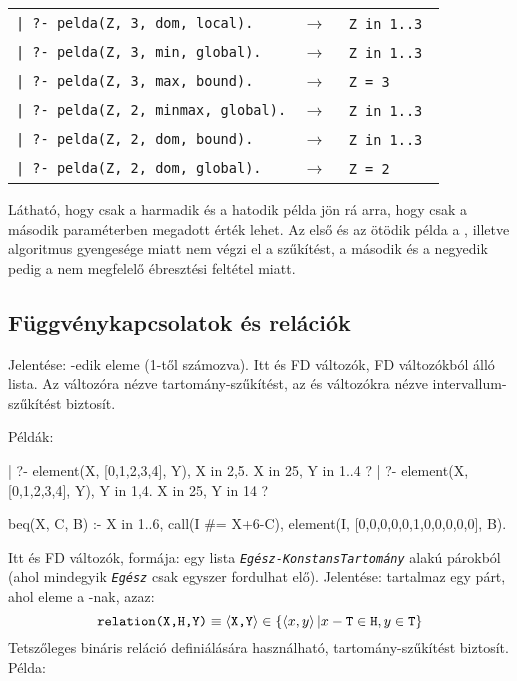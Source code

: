 \begin{tabular}{ll}
\verb'| ?- pelda(Z, 3, dom, local).'    & $\rightarrow$ \verb'  Z in 1..3 '  \\
\verb'| ?- pelda(Z, 3, min, global).'   & $\rightarrow$ \verb'  Z in 1..3 '  \\
\verb'| ?- pelda(Z, 3, max, bound).'    & $\rightarrow$ \verb'  Z = 3     '  \\
\verb'| ?- pelda(Z, 2, minmax, global).'& $\rightarrow$ \verb'  Z in 1..3 '  \\
\verb'| ?- pelda(Z, 2, dom, bound).'    & $\rightarrow$ \verb'  Z in 1..3 '  \\
\verb'| ?- pelda(Z, 2, dom, global).'   & $\rightarrow$ \verb'  Z = 2     '  \\
\end{tabular}
\br
Látható, hogy csak a harmadik és a hatodik példa jön rá arra, hogy  csak
a második paraméterben megadott érték lehet. Az első és az ötödik példa a ,
illetve  algoritmus gyengesége miatt nem végzi el a szűkítést, a második
és a negyedik pedig a nem megfelelő ébresztési feltétel miatt.

\subsection{Függvénykapcsolatok és relációk}

{}

Jelentése:  -edik eleme  (1-től számozva). Itt  és 
FD változók,  FD változókból álló lista. Az  változóra nézve
tartomány-szűkítést, az  és  változókra nézve intervallum-szűkítést
biztosít.

Példák:

\begin{prologcode}
| ?- element(X, [0,1,2,3,4], Y), X in {2,5}.  %
X in {2}\/{5}, Y in 1..4 ?                    %
| ?- element(X, [0,1,2,3,4], Y), Y in {1,4}.
X in {2}\/{5}, Y in {1}\/{4} ?                %

beq(X, C, B) :-
        X in 1..6, call(I #= X+6-C),
        element(I, [0,0,0,0,0,1,0,0,0,0,0], B).
\end{prologcode}

\medskip
{}

Itt  és  FD változók,  formája: egy lista
{\tt\em Egész-KonstansTartomány} alakú párokból (ahol mindegyik {\tt\em Egész}
csak egyszer fordulhat elő). Jelentése:  tartalmaz egy  párt,
ahol  eleme a -nak, azaz: \[ \texttt{relation(X,H,Y)} \equiv \left\langle\texttt{X,Y}\right\rangle
\in \{\left\langle x,y\right\rangle|x-\texttt{T} \in \texttt{H}, y \in \texttt{T}\}\] Tetszőleges bináris reláció
definiálására használható, tartomány-szűkítést biztosít. Példa:

